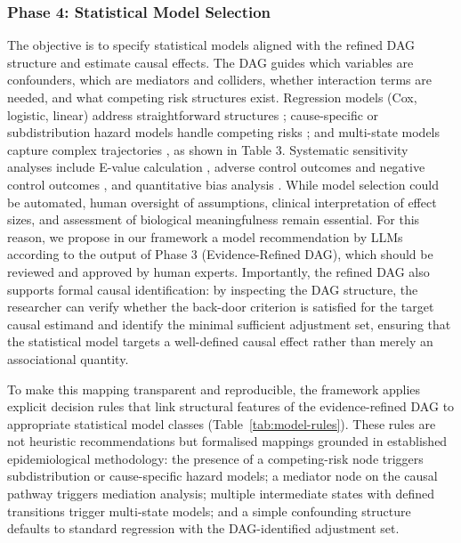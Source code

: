 \documentclass[sn-vancouver-num]{sn-jnl}
\begin{document}
\subsubsection{Phase 4: Statistical Model Selection}
The objective is to specify statistical models aligned with the refined DAG structure and estimate causal effects. The DAG guides which variables are confounders, which are mediators and colliders, whether interaction terms are needed, and what competing risk structures exist. Regression models (Cox, logistic, linear) address straightforward structures \citep{austin2016}; cause-specific or subdistribution hazard models handle competing risks \citep{putter2007}; and multi-state models capture complex trajectories \citep{haber2022}, as shown in Table 3. Systematic sensitivity analyses include E-value calculation \citep{vanderweele2017}, adverse control outcomes and negative control outcomes \citep{westreich2013}, and quantitative bias analysis \citep{lash2014}. While model selection could be automated, human oversight of assumptions, clinical interpretation of effect sizes, and assessment of biological meaningfulness remain essential. For this reason, we propose in our framework a model recommendation by LLMs according to the output of Phase 3 (Evidence-Refined DAG), which should be reviewed and approved by human experts. Importantly, the refined DAG also supports formal causal identification: by inspecting the DAG structure, the researcher can verify whether the back-door criterion is satisfied for the target causal estimand and identify the minimal sufficient adjustment set, ensuring that the statistical model targets a well-defined causal effect rather than merely an associational quantity. 

To make this mapping transparent and reproducible, the framework applies explicit decision rules that link structural features of the evidence-refined DAG to appropriate statistical model classes (Table~\ref{tab:model-rules}). These rules are not heuristic recommendations but formalised mappings grounded in established epidemiological methodology: the presence of a competing-risk node triggers subdistribution or cause-specific hazard models; a mediator node on the causal pathway triggers mediation analysis; multiple intermediate states with defined transitions trigger multi-state models; and a simple confounding structure defaults to standard regression with the DAG-identified adjustment set.
\end{document}
